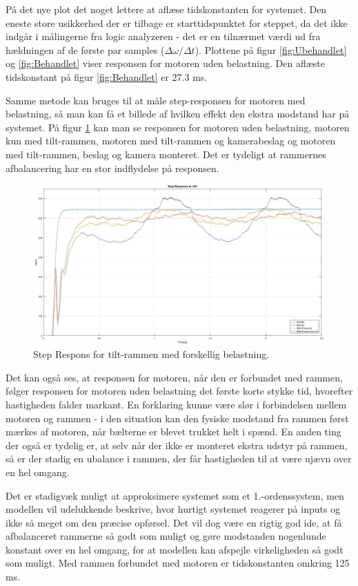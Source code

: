 På det nye plot det noget lettere at aflæse tidskonstanten for systemet. Den eneste store usikkerhed der er tilbage er starttidspunktet for steppet, da det ikke indgår i målingerne fra logic analyzeren - det er en tilnærmet værdi ud fra hældningen af de første par samples ($\Delta\omega/\Delta t$). Plottene på figur \ref{fig:Ubehandlet} og \ref{fig:Behandlet} viser responsen for motoren uden belastning. Den aflæste tidskonstant på figur \ref{fig:Behandlet} er 27.3 ms.

Samme metode kan bruges til at måle step-responsen for motoren med belastning, så man kan få et billede af hvilken effekt den ekstra modstand har på systemet. På figur \ref{fig:Combined} kan man se responsen for motoren uden belastning, motoren kun med tilt-rammen, motoren med tilt-rammen og kamerabeslag og motoren med tilt-rammen, beslag og kamera monteret. Det er tydeligt at rammernes afbalancering har en stor indflydelse på responsen.

\begin{figure}[h]
	\begin{center}
		\includegraphics[scale=0.35]{Billeder/Response_Combined.jpg}
	\end{center}
\label{fig:Combined}
\caption{Step Respons for tilt-rammen med forskellig belastning.}
\end{figure}

Det kan også ses, at responsen for motoren, når den er forbundet med rammen, følger responsen for motoren uden belastning det første korte stykke tid, hvorefter hastigheden falder markant. En forklaring kunne være slør i forbindelsen mellem motoren og rammen - i den situation kan den fysiske modstand fra rammen først mærkes af motoren, når bælterne er blevet trukket helt i spænd. En anden ting der også er tydelig er, at selv når der ikke er monteret ekstra udstyr på rammen, så er der stadig en ubalance i rammen, der får hastigheden til at være ujævn over en hel omgang.

Det er stadigvæk muligt at approksimere systemet som et 1.-ordenssystem, men modellen vil udelukkende beskrive, hvor hurtigt systemet reagerer på inputs og ikke så meget om den præcise opførsel. Det vil dog være en rigtig god ide, at få afbalanceret rammerne så godt som muligt og gøre modstanden nogenlunde konstant over en hel omgang, for at modellen kan afspejle virkeligheden så godt som muligt. Med rammen forbundet med motoren er tidskonstanten omkring 125 ms.